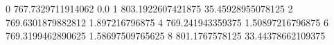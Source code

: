 0 767.7329711914062 0.0
1 803.1922607421875 35.45928955078125
2 769.6301879882812 1.897216796875
4 769.241943359375 1.50897216796875
6 769.3199462890625 1.58697509765625
8 801.1767578125 33.44378662109375
